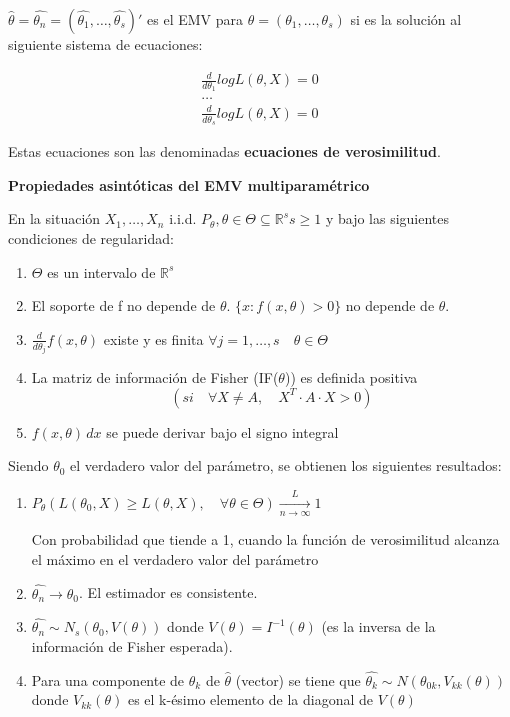 $\widehat{\theta}=\widehat{\theta_n}=(\widehat{\theta_1},\dots,\widehat{\theta_s})'$ es el EMV para $\theta=(\theta_1,\dots,\theta_s)$
si es la solución al siguiente sistema de ecuaciones:

\[
\begin{matrix}
    \frac{d}{d \theta_1} log L(\theta,X)=0 \\
    \dots \\
    \frac{d}{d \theta_s} log L(\theta,X)=0
\end{matrix}
\]

Estas ecuaciones son las denominadas \textbf{ecuaciones de verosimilitud}.

\textbf{Propiedades asintóticas del EMV multiparamétrico}

En la situación $X_1,\dots,X_n$ i.i.d. $P_\theta, \theta \in \Theta \subseteq \mathbb{R}^s s\geq1$
y bajo las siguientes condiciones de regularidad:

\begin{enumerate}
    \item $\Theta$ es un intervalo de $\mathbb{R}^s$
    \item El soporte de f no depende de $\theta$. $\{x:f(x,\theta)>0\}$ no depende de $\theta$.
    \item $\frac{d}{d \theta_j} f(x,\theta)$ existe y es finita $\forall j=1,\dots,s \quad \theta \in \Theta$
    \item La matriz de información de Fisher (IF($\theta$)) es definida positiva \[ (si \quad \forall X \neq A, \quad X^T \cdot A \cdot X >0) \]
    \item $f(x,\theta) \,dx$ se puede derivar bajo el signo integral
\end{enumerate}
\newpage
Siendo $\theta_0$ el verdadero valor del parámetro, se obtienen los siguientes resultados:

\begin{enumerate}
    \item $P_\theta(L(\theta_0,X)\geq L(\theta,X),\quad \forall \theta \in \Theta) \xrightarrow[n \to \infty]{L}1$
    
    Con probabilidad que tiende a 1, cuando la función de verosimilitud alcanza el máximo en el verdadero valor del parámetro
    \item $\widehat{\theta_n} \to \theta_0$. El estimador es consistente.
    \item $\widehat{\theta_n} \sim N_s(\theta_0,V(\theta))$ donde $V(\theta)=I^{-1}(\theta)$ (es la inversa de la información de Fisher esperada).
    \item Para una componente de $\widehat{\theta_k}$ de $\widehat{\theta}$ (vector) se tiene que $\widehat{\theta_k} \sim N(\theta_{0k},V_{kk}(\theta))$
    donde $V_{kk}(\theta)$ es el k-ésimo elemento de la diagonal de $V(\theta)$
\end{enumerate}

